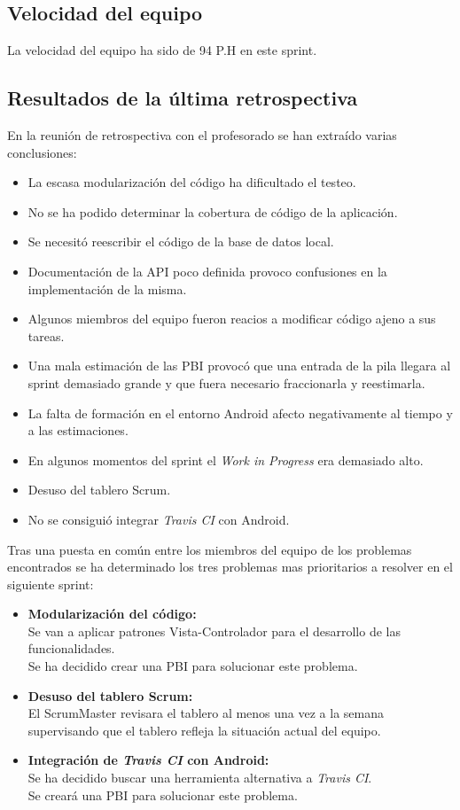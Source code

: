 \documentclass[11pt,a4paper]{report}
\begin{document}
\subsection{Velocidad del equipo}
La velocidad del equipo ha sido de 94 P.H en este sprint.
\subsection{Resultados de la última retrospectiva}
En la reunión de retrospectiva con el profesorado se han extraído varias conclusiones:
\begin{itemize}
	\item La escasa modularización del código ha dificultado el testeo.
	\item No se ha podido determinar la cobertura de código de la aplicación.
	\item Se necesitó reescribir el código de la base de datos local.
	\item Documentación de la API poco definida provoco confusiones en la implementación de la misma.
	\item Algunos miembros del equipo fueron reacios a modificar código ajeno a sus tareas.
	\item Una mala estimación de las PBI provocó que una entrada de la pila llegara al sprint demasiado grande y que fuera necesario fraccionarla y reestimarla.
	\item La falta de formación en el entorno Android afecto negativamente al tiempo y a las estimaciones.
	\item En algunos momentos del sprint el \textit{Work in Progress} era demasiado alto.
	\item Desuso del tablero Scrum.
	\item No se consiguió integrar \textit{Travis CI} con Android.
\end{itemize}
Tras una puesta en común entre los miembros del equipo de los problemas encontrados se ha determinado los tres problemas mas prioritarios a resolver en el siguiente sprint:
\begin{itemize}
	\item \textbf{Modularización del código:} 
	\\Se van a aplicar patrones Vista-Controlador para el desarrollo de las funcionalidades.
	\\Se ha decidido crear una PBI para solucionar este problema.
	\item \textbf{Desuso del tablero Scrum:}
	\\El ScrumMaster revisara el tablero al menos una vez a la semana supervisando que el tablero refleja la situación actual del equipo.
	\item \textbf{Integración de \textit{Travis CI} con Android:}
	\\Se ha decidido buscar una herramienta alternativa a \textit{Travis CI}.
	\\Se creará una PBI para solucionar este problema.
\end{itemize}
\end{document}
